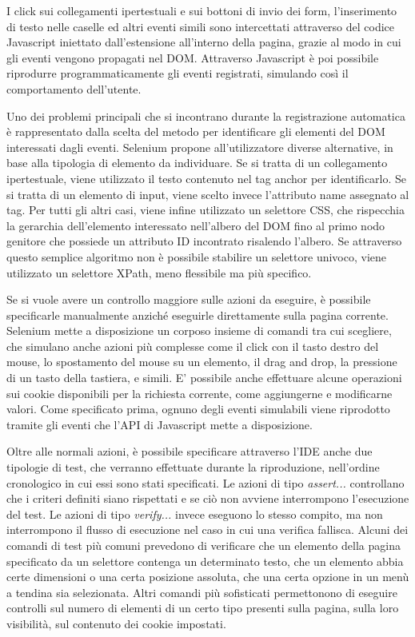 \documentclass[12pt]{toptesi}
\begin{document}
I click sui collegamenti ipertestuali e sui bottoni di invio dei form, l'inserimento di testo nelle caselle ed altri eventi simili sono intercettati attraverso del codice Javascript iniettato dall'estensione all'interno della pagina, grazie al modo in cui gli eventi vengono propagati nel DOM. Attraverso Javascript è poi possibile riprodurre programmaticamente gli eventi registrati, simulando così il comportamento dell'utente.

Uno dei problemi principali che si incontrano durante la registrazione automatica è rappresentato dalla scelta del metodo per identificare gli elementi del DOM interessati dagli eventi. Selenium propone all'utilizzatore diverse alternative, in base alla tipologia di elemento da individuare. Se si tratta di un collegamento ipertestuale, viene utilizzato il testo contenuto nel tag anchor per identificarlo. Se si tratta di un elemento di input, viene scelto invece l'attributo name assegnato al tag. Per tutti gli altri casi, viene infine utilizzato un selettore CSS, che rispecchia la gerarchia dell'elemento interessato nell'albero del DOM fino al primo nodo genitore che possiede un attributo ID incontrato risalendo l'albero. Se attraverso questo semplice algoritmo non è possibile stabilire un selettore univoco, viene utilizzato un selettore XPath, meno flessibile ma più specifico.

Se si vuole avere un controllo maggiore sulle azioni da eseguire, è possibile specificarle manualmente anziché eseguirle direttamente sulla pagina corrente. Selenium mette a disposizione un corposo insieme di comandi tra cui scegliere, che simulano anche azioni più complesse come il click con il tasto destro del mouse, lo spostamento del mouse su un elemento, il drag and drop, la pressione di un tasto della tastiera, e simili. E' possibile anche effettuare alcune operazioni sui cookie disponibili per la richiesta corrente, come aggiungerne e modificarne valori. Come specificato prima, ognuno degli eventi simulabili viene riprodotto tramite gli eventi che l'API di Javascript mette a disposizione. 

Oltre alle normali azioni, è possibile specificare attraverso l'IDE anche due tipologie di test, che verranno effettuate durante la riproduzione, nell'ordine cronologico in cui essi sono stati specificati. Le azioni di tipo \emph{assert...} controllano che i criteri definiti siano rispettati e se ciò non avviene interrompono l'esecuzione del test. Le azioni di tipo \emph{verify...} invece eseguono lo stesso compito, ma non interrompono il flusso di esecuzione nel caso in cui una verifica fallisca.
Alcuni dei comandi di test più comuni prevedono di verificare che un elemento della pagina specificato da un selettore contenga un determinato testo, che un elemento abbia certe dimensioni o una certa posizione assoluta, che una certa opzione in un menù a tendina sia selezionata. Altri comandi più sofisticati permettonono di eseguire controlli sul numero di elementi di un certo tipo presenti sulla pagina, sulla loro visibilità, sul contenuto dei cookie impostati.
\end{document}
